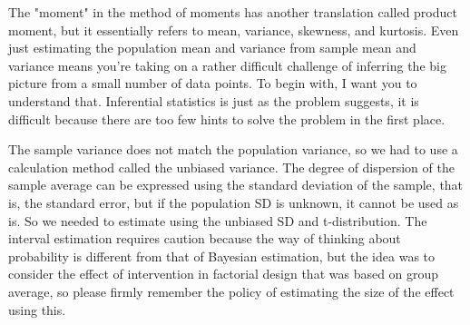 \documentclass{ltjbook}
\begin{document}
The "moment" in the method of moments has another translation called product moment, but it essentially refers to mean, variance, skewness, and kurtosis. Even just estimating the population mean and variance from sample mean and variance means you're taking on a rather difficult challenge of inferring the big picture from a small number of data points. To begin with, I want you to understand that. Inferential statistics is just as the problem suggests, it is difficult because there are too few hints to solve the problem in the first place.

The sample variance does not match the population variance, so we had to use a calculation method called the unbiased variance. The degree of dispersion of the sample average can be expressed using the standard deviation of the sample, that is, the standard error, but if the population SD is unknown, it cannot be used as is. So we needed to estimate using the unbiased SD and t-distribution. The interval estimation requires caution because the way of thinking about probability is different from that of Bayesian estimation, but the idea was to consider the effect of intervention in factorial design that was based on group average, so please firmly remember the policy of estimating the size of the effect using this.
\end{document}
